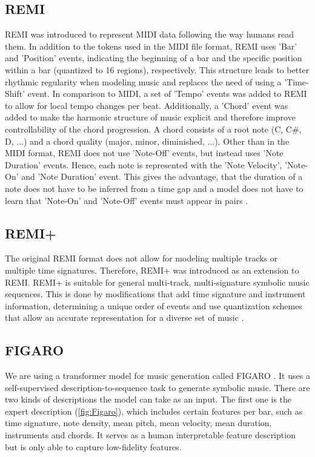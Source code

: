 \documentclass{article}
\begin{document}
\subsection{REMI}
REMI was introduced to represent MIDI data following the way humans read them. In addition to the tokens used in the MIDI file format, REMI uses 'Bar' and 'Position' events, indicating the beginning of a bar and the specific position within a bar (quantized to 16 regions), respectively. This structure leads to better rhythmic regularity when modeling music and replaces the need of using a 'Time-Shift' event. In comparison to MIDI, a set of 'Tempo' events was added to REMI to allow for local tempo changes per beat. Additionally, a 'Chord' event was added to make the harmonic structure of music explicit and therefore improve controllability of the chord progression. A chord consists of a root note (C, C\#, D, ...) and a chord quality (major, minor, diminished, ...). Other than in the MIDI format, REMI does not use 'Note-Off' events, but instead uses 'Note Duration' events. Hence, each note is represented with the 'Note Velocity', 'Note-On' and 'Note Duration' event. This gives the advantage, that the duration of a note does not have to be inferred from a time gap and a model does not have to learn that 'Note-On' and 'Note-Off' events must appear in pairs \cite{DBLP:journals/corr/abs-2002-00212}.

\subsection{REMI+}
The original REMI format does not allow for modeling multiple tracks or multiple time signatures. Therefore, REMI+ was introduced as an extension to REMI. REMI+ is suitable for general multi-track, multi-signature symbolic music sequences. This is done by modifications that add time signature and instrument information, determining a unique order of events and use quantization schemes that allow an accurate representation for a diverse set of music \cite{von2022figaro}.

\subsection{FIGARO}
We are using a transformer model for music generation called FIGARO \cite{von2022figaro}. It uses a self-supervised description-to-sequence task to generate symbolic music. There are two kinds of descriptions the model can take as an input. The first one is the expert description (\cref{fig:Figaro}), which includes certain features per bar, such as time signature, note density, mean pitch, mean velocity, mean duration, instruments and chords. It serves as a human interpretable feature description but is only able to capture low-fidelity features.  
\end{document}
